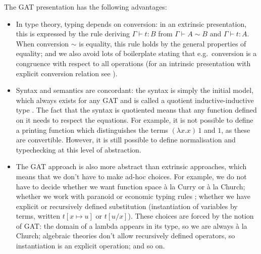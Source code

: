 \documentclass[a4paper,UKenglish]{article}
\begin{document}
The GAT presentation has the following advantages:
\begin{itemize}
\item In type theory, typing depends on conversion: in an extrinsic
  presentation, this is expressed by the rule deriving $\Gamma\vdash t
  : B$ from $\Gamma\vdash A \sim B$ and $\Gamma\vdash t : A$.  When
  conversion $\sim$ is equality, this rule holds by the general
  properties of equality; and we also avoid lots of boilerplate
  stating that e.g.\ conversion is a congruence with respect to all
  operations (for an intrinsic presentation with explicit conversion
  relation see \cite{chapman09eatitself}).
\item Syntax and semantics are concordant: the syntax is simply the
  initial model, which always exists for any GAT and is called a
  quotient inductive-inductive type
  \cite{DBLP:journals/pacmpl/KaposiKA19}. The fact that the syntax is
  quotiented means that any function defined on it needs to respect
  the equations. For example, it is not possible to define a printing
  function which distinguishes the terms $(\lambda x.x)\,1$ and $1$,
  as these are convertible. However, it is still possible to define
  normalisation \cite{lmcs:4005} and typechecking \cite{typecheck} at
  this level of abstraction.
\item The GAT approach is also more abstract than extrinsic
  approaches, which means that we don't have to make ad-hoc
  choices. For example, we do not have to decide whether we want
  function space {\`a} la Curry or {\`a} la Church; whether we work
  with paranoid or economic typing rules \cite[Section
    5]{winterhalter:hal-01626651}; whether we have explicit or
  recursively defined substitution (instantiation of variables by
  terms, written $t[x\mapsto u]$ or $t[u/x]$).  These choices are
  forced by the notion of GAT: the domain of a lambda appears in its
  type, so we are always {\`a} la Church; algebraic theories don't
  allow recursively defined operators, so instantiation is an explicit
  operation; and so on.
\end{itemize}

\end{document}
